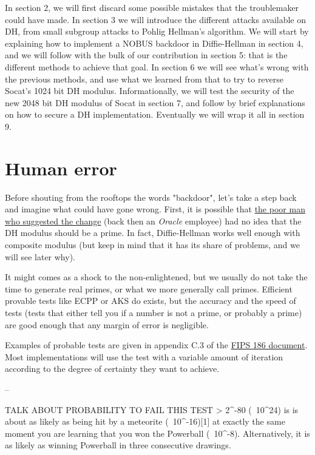 \documentclass[a4paper,11pt]{article}
\begin{document}
In section 2, we will first discard some possible mistakes that the troublemaker could have made. In section 3 we will introduce the different attacks available on DH, from small subgroup attacks to Pohlig Hellman's algorithm. We will start by explaining how to implement a NOBUS backdoor in Diffie-Hellman in section 4, and we will follow with the bulk of our contribution in section 5: that is the different methods to achieve that goal. In section 6 we will see what's wrong with the previous methods, and use what we learned from that to try to reverse Socat's 1024 bit DH modulus. Informationally, we will test the security of the new 2048 bit DH modulus of Socat in section 7, and follow by brief explanations on how to secure a DH implementation. Eventually we will wrap it all in section 9.

\section{Human error}\label{mistake}

Before shouting from the rooftops the words "backdoor", let's take a step back and imagine what could have gone wrong. First, it is possible that \href{http://repo.or.cz/socat.git/commitdiff/281d1bd6515c2f0f8984fc168fb3d3b91c20bdc0}{the poor man who suggested the change} (back then an \emph{Oracle} employee) had no idea that the DH modulus should be a prime. In fact, Diffie-Hellman works well enough with composite modulus (but keep in mind that it has its share of problems, and we will see later why). 

It might comes as a shock to the non-enlightened, but we usually do not take the time to generate real primes, or what we more generally call  primes. Efficient provable tests like ECPP or AKS \cite{ecpp} do exists, but the accuracy and the speed of  tests (tests that either tell you if a number is not a prime, or probably a prime) are good enough that any margin of error is negligible.

Examples of probable tests are given in appendix C.3 of the  \href{http://csrc.nist.gov/publications/fips/fips186-3/fips_186-3.pdf}{FIPS 186 document}. Most implementations will use the  test with a variable amount of iteration according to the degree of certainty they want to achieve.

--

TALK ABOUT PROBABILITY TO FAIL THIS TEST
>  2^-80 (~10^24) is is about as likely as being hit by a meteorite (~10^-16)[1] at exactly the same moment you are learning that you won the Powerball (~10^-8). Alternatively, it is as likely as winning Powerball in three consecutive drawings.
\end{document}
